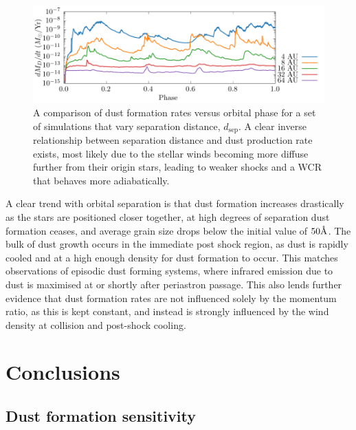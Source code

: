 
\begin{figure}
  \centering
  \includegraphics{assets/dsep-results/dsep-phase-dust_rate.pdf}
  \caption[Dust formation rate vs. binary separation distance]{A comparison of dust formation rates versus orbital phase for a set of simulations that vary separation distance, $d_\text{sep}$. A clear inverse relationship between separation distance and dust production rate exists, most likely due to the stellar winds becoming more diffuse further from their origin stars, leading to weaker shocks and a WCR that behaves more adiabatically.}
  \label{fig:dsepdustproduction}
\end{figure}

A clear trend with orbital separation is that dust formation increases drastically as the stars are positioned closer together, at high degrees of separation dust formation ceases, and average grain size drops below the initial value of $50 \text \AA$.
The bulk of dust growth occurs in the immediate post shock region, as dust is rapidly cooled and at a high enough density for dust formation to occur.
This matches observations of episodic dust forming systems, where infrared emission due to dust is maximised at or shortly after periastron passage. This also lends further evidence that dust formation rates are not influenced solely by the momentum ratio, as this is kept constant, and instead is strongly influenced by the wind density at collision and post-shock cooling. 

\section{Conclusions}

\subsection{Dust formation sensitivity}

